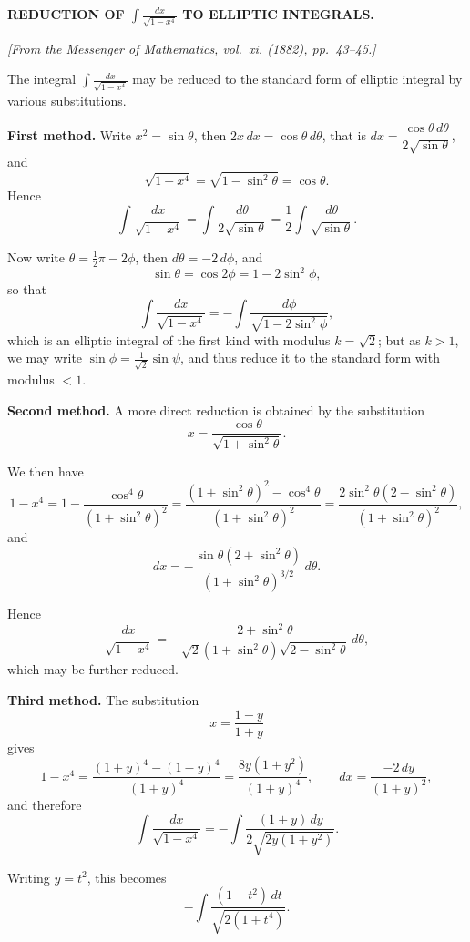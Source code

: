 \documentclass[11pt,a4paper]{book}
\begin{document}
\begin{center}
\textbf{REDUCTION OF $\displaystyle\int \frac{dx}{\sqrt{1-x^4}}$ TO ELLIPTIC INTEGRALS.}
\end{center}

\begin{flushright}
\textit{[From the Messenger of Mathematics, vol.~xi. (1882), pp.~43--45.]}
\end{flushright}

The integral $\displaystyle\int \frac{dx}{\sqrt{1-x^4}}$ may be reduced to the standard
form of elliptic integral by various substitutions.

\textbf{First method.} Write $x^2 = \sin\theta$, then $2x\,dx = \cos\theta\,d\theta$, that is
$dx = \dfrac{\cos\theta\,d\theta}{2\sqrt{\sin\theta}}$, and
%
\[
\sqrt{1-x^4} = \sqrt{1-\sin^2\theta} = \cos\theta.
\]
%
Hence
%
\[
\int \frac{dx}{\sqrt{1-x^4}}
= \int \frac{d\theta}{2\sqrt{\sin\theta}}
= \frac{1}{2} \int \frac{d\theta}{\sqrt{\sin\theta}}.
\]

Now write $\theta = \tfrac{1}{2}\pi - 2\phi$, then $d\theta = -2\,d\phi$, and
%
\[
\sin\theta = \cos 2\phi = 1 - 2\sin^2\phi,
\]
%
so that
%
\[
\int \frac{dx}{\sqrt{1-x^4}}
= -\int \frac{d\phi}{\sqrt{1-2\sin^2\phi}},
\]
%
which is an elliptic integral of the first kind with modulus $k = \sqrt{2}$;
but as $k > 1$, we may write $\sin\phi = \tfrac{1}{\sqrt{2}} \sin\psi$, and thus reduce it
to the standard form with modulus $< 1$.

\textbf{Second method.} A more direct reduction is obtained by the substitution
%
\[
x = \frac{\cos\theta}{\sqrt{1+\sin^2\theta}}.
\]

We then have
%
\[
1 - x^4 = 1 - \frac{\cos^4\theta}{(1+\sin^2\theta)^2}
= \frac{(1+\sin^2\theta)^2 - \cos^4\theta}{(1+\sin^2\theta)^2}
= \frac{2\sin^2\theta(2-\sin^2\theta)}{(1+\sin^2\theta)^2},
\]
and
%
\[
dx = -\frac{\sin\theta(2+\sin^2\theta)}{(1+\sin^2\theta)^{3/2}}\,d\theta.
\]

Hence
%
\[
\frac{dx}{\sqrt{1-x^4}}
= -\frac{2+\sin^2\theta}{\sqrt{2}(1+\sin^2\theta)\sqrt{2-\sin^2\theta}}\,d\theta,
\]
%
which may be further reduced.

\textbf{Third method.} The substitution
%
\[
x = \frac{1-y}{1+y}
\]
%
gives
%
\[
1 - x^4 = \frac{(1+y)^4 - (1-y)^4}{(1+y)^4}
= \frac{8y(1+y^2)}{(1+y)^4},
\qquad
dx = \frac{-2\,dy}{(1+y)^2},
\]
%
and therefore
%
\[
\int \frac{dx}{\sqrt{1-x^4}}
= -\int \frac{(1+y)\,dy}{2\sqrt{2y(1+y^2)}}.
\]

Writing $y = t^2$, this becomes
%
\[
-\int \frac{(1+t^2)\,dt}{\sqrt{2(1+t^4)}}.
\]
\end{document}

